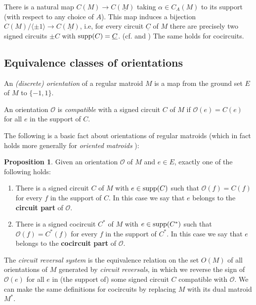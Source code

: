 \documentclass[12pt]{amsart}
\numberwithin{equation}{section}
\theoremstyle{definition}
\newtheorem{proposition}[theorem]{Proposition}
\begin{document}
\medskip

There is a natural map $C(M) \to C(\underline{M})$ taking $\alpha \in C_A(M)$ to its support (with respect to any choice of $A$).
This map induces a bijection $C(M) / \langle \pm 1 \rangle \to C(\underline{M})$, i.e, for every circuit $\underline{C}$ of $M$ there are precisely two signed
circuits $\pm C$ with ${\rm supp}(C) = \underline{C}$.
(cf. \cite[Lemma 8]{su2010lattice} and \cite[Theorem~4.3.5]{merino1999matroids})
The same holds for cocircuits.


\subsection{Equivalence classes of orientations}
\label{sec:equivclassorient}

\medskip

An {\em (discrete) orientation} of a regular matroid $M$ is a map from the ground set $E$ of $M$ to $\{ -1, 1 \}$.  

An orientation ${\mathcal O}$ is {\em compatible} with a signed circuit $C$ of $M$ if ${\mathcal O}(e) = C(e)$ for all $e$ in the support of $C$.

The following is a basic fact about orientations of regular matroids (which in fact holds more generally for {\em oriented matroids} \cite[Corollary 3.4.6]{bjorner1999oriented}):

\begin{proposition} \label{prop:orientdecomp}
Given an orientation $\mathcal{O}$ of $M$ and $e \in E$, exactly one of the following holds:
\begin{enumerate}
\item There is a signed circuit $C$ of $M$ with $e \in {\rm supp}(C)$ such that ${\mathcal O}(f) = C(f)$ for every $f$ in the support of $C$.  In this case we say that $e$ belongs to the {\bf circuit part} of $\mathcal{O}$.
\item There is a signed cocircuit $C^*$ of $M$ with $e \in {\rm supp}(C^*)$ such that ${\mathcal O}(f) = C^*(f)$ for every $f$ in the support of $C^*$. In this case we say that $e$ belongs to the {\bf cocircuit part} of $\mathcal{O}$.
\end{enumerate}
\end{proposition}

The {\em circuit reversal system} is the equivalence relation on the set $O(M)$ of all orientations of $M$ generated by {\em circuit reversals},
in which we reverse the sign of ${\mathcal O}(e)$ for all $e$ in (the support of) some signed circuit $C$ compatible with ${\mathcal O}$.
We can make the same definitions for cocircuits by replacing $M$ with its dual matroid $M^*$.
\end{document}
